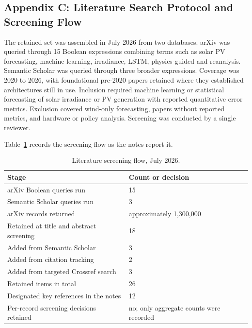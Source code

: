 \subsection*{Appendix C: Literature Search Protocol and Screening Flow}

The retained set was assembled in July 2026 from two databases. arXiv was queried through 15 Boolean expressions combining terms such as solar PV forecasting, machine learning, irradiance, LSTM, physics-guided and reanalysis. Semantic Scholar was queried through three broader expressions. Coverage was 2020 to 2026, with foundational pre-2020 papers retained where they established architectures still in use. Inclusion required machine learning or statistical forecasting of solar irradiance or PV generation with reported quantitative error metrics. Exclusion covered wind-only forecasting, papers without reported metrics, and hardware or policy analysis. Screening was conducted by a single reviewer.

\setcounter{table}{0}
\renewcommand{\thetable}{C.\arabic{table}}

Table~\ref{tab:app_c1} records the screening flow as the notes report it.

\begin{table}[h!]
\centering
\caption{Literature screening flow, July 2026.}
\label{tab:app_c1}
\footnotesize
\begin{tabularx}{\linewidth}{|l|X|}
\hline
\textbf{Stage} & \textbf{Count or decision} \\
\hline
arXiv Boolean queries run & 15 \\
Semantic Scholar queries run & 3 \\
arXiv records returned & approximately 1,300,000 \\
Retained at title and abstract screening & 18 \\
Added from Semantic Scholar & 3 \\
Added from citation tracking & 2 \\
Added from targeted Crossref search & 3 \\
Retained items in total & 26 \\
Designated key references in the notes & 12 \\
Per-record screening decisions retained & no; only aggregate counts were recorded \\
\hline
\end{tabularx}
\end{table}

